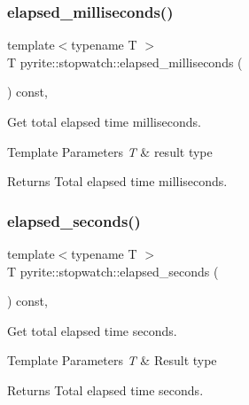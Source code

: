 \subsubsection{\texorpdfstring{elapsed\+\_\+milliseconds()}{elapsed\_milliseconds()}}
{\footnotesize\ttfamily template$<$typename T $>$ \\
T pyrite\+::stopwatch\+::elapsed\+\_\+milliseconds (\begin{DoxyParamCaption}{ }\end{DoxyParamCaption}) const\hspace{0.3cm}{\ttfamily [inline]}, {\ttfamily [noexcept]}}

Get total elapsed time milliseconds. 
\begin{DoxyTemplParams}{Template Parameters}
{\em T} & result type \\
\hline
\end{DoxyTemplParams}
\begin{DoxyReturn}{Returns}
Total elapsed time milliseconds. 
\end{DoxyReturn}
\mbox{\label{classpyrite_1_1stopwatch_a2925d97a9c0ec2ae7b4ebbea0e15e5eb}} 
\subsubsection{\texorpdfstring{elapsed\+\_\+seconds()}{elapsed\_seconds()}}
{\footnotesize\ttfamily template$<$typename T $>$ \\
T pyrite\+::stopwatch\+::elapsed\+\_\+seconds (\begin{DoxyParamCaption}{ }\end{DoxyParamCaption}) const\hspace{0.3cm}{\ttfamily [inline]}, {\ttfamily [noexcept]}}

Get total elapsed time seconds. 
\begin{DoxyTemplParams}{Template Parameters}
{\em T} & Result type \\
\hline
\end{DoxyTemplParams}
\begin{DoxyReturn}{Returns}
Total elapsed time seconds. 
\end{DoxyReturn}
\mbox{\label{classpyrite_1_1stopwatch_add72890f54bc7554c32b9588ac761eed}} 
